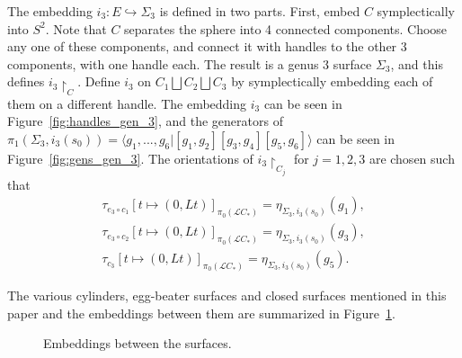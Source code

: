 \documentclass[11pt]{article}
\newenvironment{myequation}
    {
        \begin{equation*}
        \begin{gathered}
    }
    { 
        \end{gathered} 
        \end{equation*}
    }
\begin{document}
        The embedding $i_3: E \hookrightarrow \Sigma_3$ is defined in two parts. First, embed $C$ symplectically into $S^2$. Note that $C$ separates the sphere into 4 connected components. Choose any one of these components, and connect it with handles to the other 3 components, with one handle each. The result is a genus 3 surface $\Sigma_3$, and this defines $i_3 \restriction_C$. Define $i_3$ on $C_1 \bigsqcup C_2 \bigsqcup C_3$ by symplectically embedding each of them on a different handle. The embedding $i_3$ can be seen in Figure~\ref{fig:handles_gen_3}, and the generators of $\pi_1(\Sigma_3,i_3(s_0)) = \langle g_1,...,g_6 | [g_1,g_2][g_3,g_4][g_5,g_6] \rangle$ can be seen in Figure~\ref{fig:gens_gen_3}. The orientations of $i_3 \restriction_{C_j}$ for $j=1,2,3$ are chosen such that
        \begin{myequation}
            \tau_{e_3 \circ c_1} [t \mapsto (0,Lt)]_{\pi_0(\mathscr{L}C_*)} = \eta_{\Sigma_3,i_3(s_0)}(g_1) ,\\
            \tau_{e_3 \circ c_2} [t \mapsto (0,Lt)]_{\pi_0(\mathscr{L}C_*)} = \eta_{\Sigma_3,i_3(s_0)}(g_3) ,\\
            \tau_{c_3} [t \mapsto (0,Lt)]_{\pi_0(\mathscr{L}C_*)} = \eta_{\Sigma_3,i_3(s_0)}(g_5) .
        \end{myequation}
        
        The various cylinders, egg-beater surfaces and closed surfaces mentioned in this paper and the embeddings between them are summarized in Figure~\ref{fig:embeddings}.
        
        \begin{figure}[!ht]
            \centering
            \caption{Embeddings between the surfaces.}
            \label{fig:embeddings}
        \end{figure}
        
\end{document}
